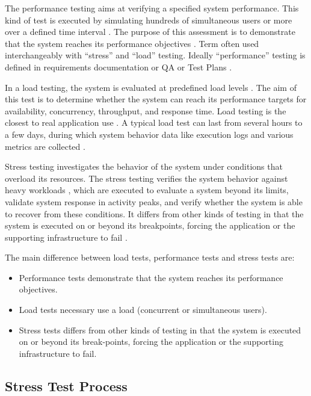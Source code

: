 \documentclass{report}
\begin{document}
The performance testing aims at verifying a specified system performance. This kind of test is executed by simulating hundreds of simultaneous users or more over a defined time interval \cite{DiLucca2006}. The purpose of this assessment is to demonstrate that the system reaches its performance objectives \cite{Sandler2004}.  Term often used interchangeably with “stress” and “load” testing. Ideally “performance” testing is defined in requirements documentation or QA or Test Plans \cite{Lewis2005}.


In a load testing, the system is evaluated at predefined load levels \cite{DiLucca2006}. The aim of this test is to determine whether the system can reach its performance targets for availability, concurrency, throughput, and response time. Load testing is the closest to real application use \cite{Molyneaux2009}. A typical load test can last from several hours to a few days, during which system behavior data like execution logs and various metrics are collected \cite{Afzal2009a}. 

Stress testing investigates the behavior of the system under conditions
that overload its resources. The stress testing verifies the system behavior against heavy workloads \cite{Sandler2004} \cite{Lewis2005}, which are executed to evaluate a system beyond its limits, validate system response in activity peaks, and verify whether the system is able to recover from these conditions. It differs from other kinds of testing in that the system is executed on or beyond its breakpoints, forcing the application or the supporting infrastructure to fail \cite{DiLucca2006} \cite{Molyneaux2009}.

The main difference between load tests, performance tests and stress tests are:

\begin{itemize}

\item Performance tests demonstrate that the system reaches its performance objectives.
\item Load tests necessary use a load (concurrent or simultaneous users).
\item Stress tests differs from other kinds of testing in that the system is executed on or beyond its break-points, forcing the application or the supporting infrastructure to fail.
\end{itemize}


\subsection{Stress Test Process}
\end{document}
